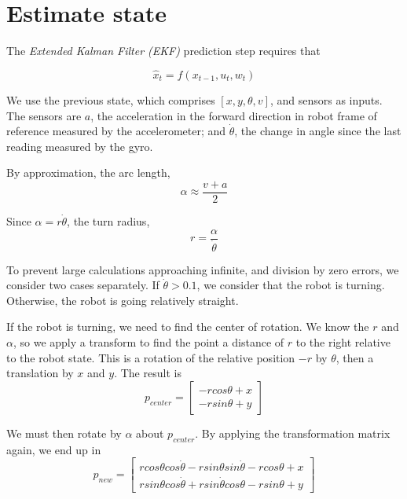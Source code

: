 \documentclass[11pt]{article}
\begin{document}
\section{Estimate state}

The \emph{Extended Kalman Filter (EKF)} prediction step requires that

\begin{equation}
\hat{x}_t = f(x_{t-1}, u_t, w_t)
\end{equation}

We use the previous state, which comprises $\left[x, y, \theta, v\right]$, and sensors as inputs. The sensors are $a$, the acceleration in the forward direction in robot frame of reference measured by the accelerometer; and $\dot{\theta}$, the change in angle since the last reading measured by the gyro.

By approximation, the arc length,
\begin{equation}
\alpha \approx \frac{v + a}{2}
\end{equation}

Since $\alpha = r \dot{\theta}$, the turn radius,
\begin{equation}
r = \frac{\alpha}{\dot{\theta}}
\end{equation}

To prevent large calculations approaching infinite, and division by zero errors, we consider two cases separately. If $\dot{\theta} > 0.1$, we consider that the robot is turning. Otherwise, the robot is going relatively straight.

If the robot is turning, we need to find the center of rotation. We know the $r$ and $\alpha$, so we apply a transform to find the point a distance of $r$ to the right relative to the robot state. This is a rotation of the relative position $-r$ by $\theta$, then a translation by $x$ and $y$. The result is
\begin{equation}
p_{center} = \begin{bmatrix}
-r cos\theta + x \\ -r sin\theta + y
\end{bmatrix}
\end{equation}

We must then rotate by $\alpha$ about $p_{center}$. By applying the transformation matrix again, we end up in
\begin{equation}
p_{new} = \begin{bmatrix}
r cos\theta cos\dot{\theta} - rsin\theta sin\dot{\theta} - r cos\theta + x \\
r sin\theta cos\dot{\theta} + r sin\dot{\theta} cos\theta - r sin\theta + y
\end{bmatrix}
\end{equation}
\end{document}
